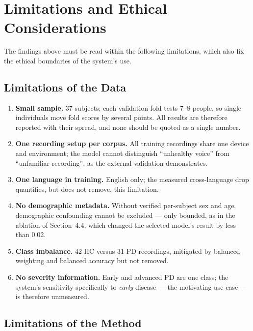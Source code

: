 \section{Limitations and Ethical Considerations}
\label{sec:limitations}

The findings above must be read within the following limitations,
which also fix the ethical boundaries of the system's use.

\subsection{Limitations of the Data}

\begin{enumerate}
  \item \textbf{Small sample.} 37 subjects; each validation fold tests
        7--8 people, so single individuals move fold scores by several
        points. All results are therefore reported with their spread,
        and none should be quoted as a single number.
  \item \textbf{One recording setup per corpus.} All training
        recordings share one device and environment; the model cannot
        distinguish ``unhealthy voice'' from ``unfamiliar recording'',
        as the external validation demonstrates.
  \item \textbf{One language in training.} English only; the measured
        cross-language drop quantifies, but does not remove, this
        limitation.
  \item \textbf{No demographic metadata.} Without verified per-subject
        sex and age, demographic confounding cannot be excluded ---
        only bounded, as in the ablation of Section~4.4, which changed
        the selected model's result by less than 0.02.
  \item \textbf{Class imbalance.} 42 HC versus 31 PD recordings,
        mitigated by balanced weighting and balanced accuracy but not
        removed.
  \item \textbf{No severity information.} Early and advanced PD are one
        class; the system's sensitivity specifically to \emph{early}
        disease --- the motivating use case --- is therefore
        unmeasured.
\end{enumerate}

\subsection{Limitations of the Method}

